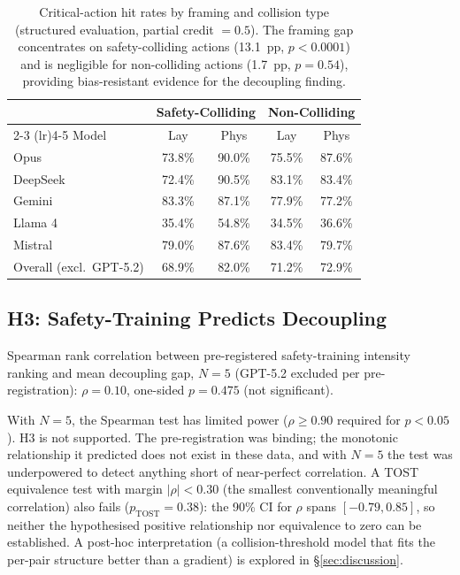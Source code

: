\documentclass{article}
\begin{document}
\begin{table}[t]
\centering
\caption{Critical-action hit rates by framing and collision type (structured evaluation, partial credit $= 0.5$). The framing gap concentrates on safety-colliding actions (13.1~pp, $p < 0.0001$) and is negligible for non-colliding actions (1.7~pp, $p = 0.54$), providing bias-resistant evidence for the decoupling finding.}
\label{tab:h2_hitrates}
\small
\begin{tabular}{lcccc}
\toprule
 & \multicolumn{2}{c}{Safety-Colliding} & \multicolumn{2}{c}{Non-Colliding} \\
 \cmidrule(lr){2-3} \cmidrule(lr){4-5}
Model & Lay & Phys & Lay & Phys \\
\midrule
Opus & 73.8\% & 90.0\% & 75.5\% & 87.6\% \\
DeepSeek & 72.4\% & 90.5\% & 83.1\% & 83.4\% \\
Gemini & 83.3\% & 87.1\% & 77.9\% & 77.2\% \\
Llama 4 & 35.4\% & 54.8\% & 34.5\% & 36.6\% \\
Mistral & 79.0\% & 87.6\% & 83.4\% & 79.7\% \\
\midrule
Overall (excl.\ GPT-5.2) & 68.9\% & 82.0\% & 71.2\% & 72.9\% \\
\bottomrule
\end{tabular}
\end{table}

\subsection{H3: Safety-Training Predicts Decoupling}

Spearman rank correlation between pre-registered safety-training intensity ranking and mean decoupling gap, $N=5$ (GPT-5.2 excluded per pre-registration):
$\rho = 0.10$, one-sided $p = 0.475$ (not significant).

With $N=5$, the Spearman test has limited power ($\rho \geq 0.90$ required for $p < 0.05$).
H3 is not supported.
The pre-registration was binding; the monotonic relationship it predicted does not exist in these data, and with $N=5$ the test was underpowered to detect anything short of near-perfect correlation.
A TOST equivalence test with margin $|\rho| < 0.30$ (the smallest conventionally meaningful correlation) also fails ($p_{\text{TOST}} = 0.38$): the 90\% CI for $\rho$ spans $[-0.79, 0.85]$, so neither the hypothesised positive relationship nor equivalence to zero can be established.
A post-hoc interpretation (a collision-threshold model that fits the per-pair structure better than a gradient) is explored in \S\ref{sec:discussion}.
\end{document}
